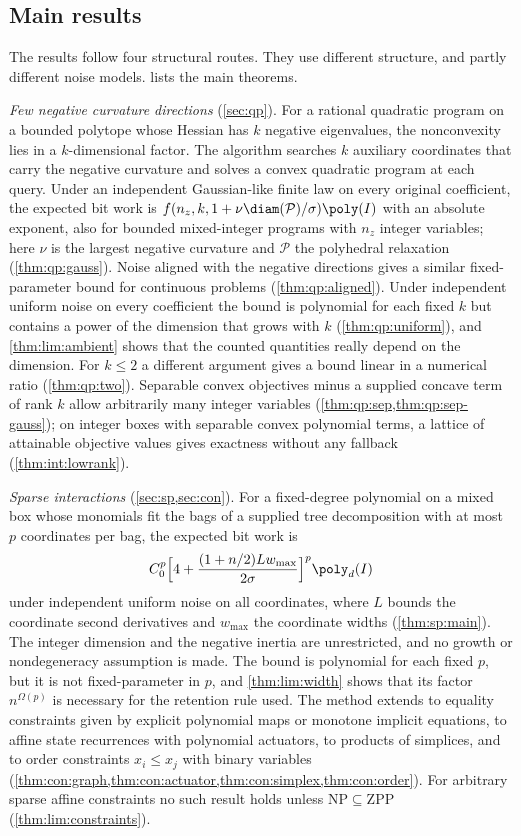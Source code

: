 \subsection{Main results}\label{sec:intro:results}

The results follow four structural routes. They use different structure,
and partly different noise models.  lists the main
theorems.

\emph{Few negative curvature directions} (\cref{sec:qp}). For a rational
quadratic program on a bounded polytope whose Hessian has $k$ negative
eigenvalues, the nonconvexity lies in a $k$-dimensional factor. The
algorithm searches $k$ auxiliary coordinates that carry the negative
curvature and solves a convex quadratic program at each query. Under an
independent Gaussian-like finite law on every original coefficient, the
expected bit work is $f(n_z,k,1+\nu\diam(\mathcal P)/\sigma)\poly(I)$ with an
absolute exponent, also for bounded mixed-integer programs with $n_z$
integer variables; here $\nu$ is the largest negative curvature and
$\mathcal P$ the polyhedral relaxation (\cref{thm:qp:gauss}). Noise aligned
with the negative directions gives a similar fixed-parameter bound for
continuous problems (\cref{thm:qp:aligned}). Under independent uniform noise
on every coefficient the bound is polynomial for each fixed $k$ but contains
a power of the dimension that grows with $k$ (\cref{thm:qp:uniform}), and
\cref{thm:lim:ambient} shows that the counted quantities really depend on
the dimension. For $k\le2$ a different argument gives a bound linear in a
numerical ratio (\cref{thm:qp:two}). Separable convex objectives minus a
supplied concave term of rank $k$ allow arbitrarily many integer variables
(\cref{thm:qp:sep,thm:qp:sep-gauss}); on integer boxes with separable convex
polynomial terms, a lattice of attainable objective values gives exactness
without any fallback (\cref{thm:int:lowrank}).

\emph{Sparse interactions} (\cref{sec:sp,sec:con}). For a fixed-degree
polynomial on a mixed box whose monomials fit the bags of a supplied tree
decomposition with at most $p$ coordinates per bag, the expected bit work is
\[
 C_0^p\Bigl[4+\frac{(1+n/2)Lw_{\max}}{2\sigma}\Bigr]^p\poly_d(I)
\]
under independent uniform noise on all coordinates, where $L$ bounds the
coordinate second derivatives and $w_{\max}$ the coordinate widths
(\cref{thm:sp:main}). The integer dimension and the negative inertia are
unrestricted, and no growth or nondegeneracy assumption is made. The bound is
polynomial for each fixed $p$, but it is not fixed-parameter in $p$, and
\cref{thm:lim:width} shows that its factor $n^{\Omega(p)}$ is necessary for
the retention rule used. The method extends to equality constraints given by
explicit polynomial maps or monotone implicit equations, to affine state
recurrences with polynomial actuators, to products of simplices, and to
order constraints $x_i\le x_j$ with binary variables
(\cref{thm:con:graph,thm:con:actuator,thm:con:simplex,thm:con:order}). For
arbitrary sparse affine constraints no such result holds unless
$\mathrm{NP}\subseteq\mathrm{ZPP}$ (\cref{thm:lim:constraints}).

